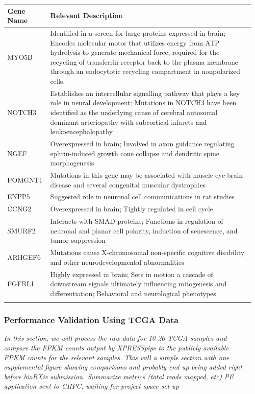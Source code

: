 \documentclass[11pt, a4paper, oneside]{article}
\begin{document}
\begin{tabular}{p{2.5cm}p{15.5cm}}
 \textbf{Gene Name} & \textbf{Relevant Description} \\
 \hline
 MYO5B & Identified in a screen for large proteins expressed in brain; Encodes molecular motor that utilizes energy from ATP hydrolysis to generate mechanical force, required for the recycling of transferrin receptor back to the plasma membrane through an endocytotic recycling compartment in nonpolarized cells. \\
 \hline
 NOTCH3 & Establishes an intercellular signalling pathway that plays a key role in neural development; Mutations in NOTCH3 have been identified as the underlying cause of cerebral autosomal dominant arteriopathy with subcortical infarcts and leukoencephalopathy \\
 \hline
 NGEF & Overexpressed in brain; Involved in axon guidance regulating ephrin-induced growth cone collapse and dendritic spine morphogenesis \\
 \hline
 POMGNT1 & Mutations in this gene may be associated with muscle-eye-brain disease and several congenital muscular dystrophies \\
 \hline
 ENPP5 & Suggested role in neuronal cell communications in rat studies \\
 \hline
 CCNG2 & Overexpressed in brain; Tightly regulated in cell cycle \\
 \hline
 SMURF2 & Interacts with SMAD proteins; Functions in regulation of neuronal and planar cell polarity, induction of senescence, and tumor suppression \\
 \hline
 ARHGEF6 & Mutations cause X-chromosomal non-specific cognitive disability and other neurodevelopmental abnormalities \\
 \hline
 FGFRL1 & Highly expressed in brain; Sets in motion a cascade of downstream signals ultimately influencing mitogenesis and differentiation; Behavioral and neurological phenotypes \\
 \label{tab:targets}
\end{tabular}
\newline

\subsubsection{Performance Validation Using TCGA Data}
\textit{In this section, we will process the raw data for 10-20 TCGA samples and compare the FPKM counts output by XPRESSpipe to the publicly available FPKM counts for the relevant samples.
This will a simple section with one supplemental figure showing comparisons and probably end up being added right before bioRXiv submission.
Summarize metrics (total reads mapped, etc)
PE application sent to CHPC, waiting for project space set-up}
\end{document}

